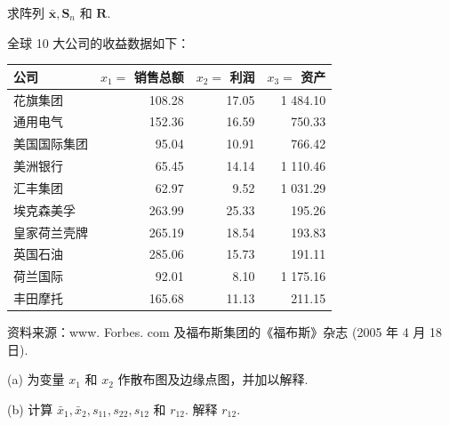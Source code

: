 求阵列 $\bar{\bm{x}}, \bm{S}_n$ 和 $\bm{R}$.

 全球 10 大公司的收益数据如下：

\begin{mvtable}
\begin{tabular}{lrrr}
\toprule
公司 & $x_1 = $ 销售总额 & $x_2 = $ 利润 & $x_3 = $ 资产 \\
\midrule
花旗集团 & 108.28 & 17.05 & 1 484.10 \\
通用电气 & 152.36 & 16.59 & 750.33 \\
美国国际集团 & 95.04 & 10.91 & 766.42 \\
美洲银行 & 65.45 & 14.14 & 1 110.46 \\
汇丰集团 & 62.97 & 9.52 & 1 031.29 \\
埃克森美孚 & 263.99 & 25.33 & 195.26 \\
皇家荷兰壳牌 & 265.19 & 18.54 & 193.83 \\
英国石油 & 285.06 & 15.73 & 191.11 \\
荷兰国际 & 92.01 & 8.10 & 1 175.16 \\
丰田摩托 & 165.68 & 11.13 & 211.15 \\
\bottomrule
\end{tabular}
\end{mvtable}

{ 资料来源：www. Forbes. com 及福布斯集团的《福布斯》杂志 (2005 年 4 月 18 日).}

(a) 为变量 $x_1$ 和 $x_2$ 作散布图及边缘点图，并加以解释.

(b) 计算 $\bar{x}_1, \bar{x}_2, s_{11}, s_{22}, s_{12}$ 和 $r_{12}$. 解释 $r_{12}$.
